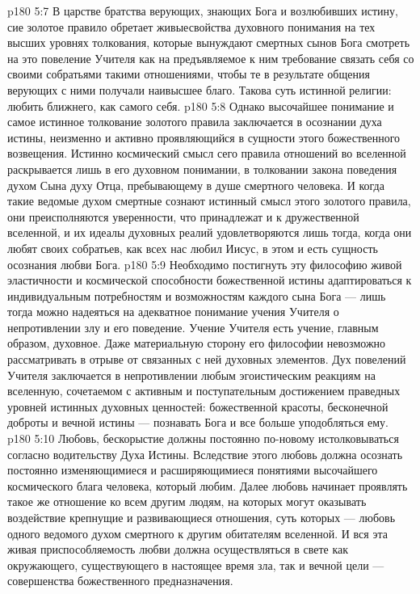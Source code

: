 \vs p180 5:7 В царстве братства верующих, знающих Бога и возлюбивших истину, сие золотое правило обретает живыесвойства духовного понимания на тех высших уровнях толкования, которые вынуждают смертных сынов Бога смотреть на это повеление Учителя как на предъявляемое к ним требование связать себя со своими собратьями такими отношениями, чтобы те в результате общения верующих с ними получали наивысшее благо. Такова суть истинной религии: любить ближнего, как самого себя.
\vs p180 5:8 Однако высочайшее понимание и самое истинное толкование золотого правила заключается в осознании духа истины, неизменно и активно проявляющийся в сущности этого божественного возвещения. Истинно космический смысл сего правила отношений во вселенной раскрывается лишь в его духовном понимании, в толковании закона поведения духом Сына духу Отца, пребывающему в душе смертного человека. И когда такие ведомые духом смертные сознают истинный смысл этого золотого правила, они преисполняются уверенности, что принадлежат и к дружественной вселенной, и их идеалы духовных реалий удовлетворяются лишь тогда, когда они любят своих собратьев, как всех нас любил Иисус, в этом и есть сущность осознания любви Бога.
\vs p180 5:9 Необходимо постигнуть эту философию живой эластичности и космической способности божественной истины адаптироваться к индивидуальным потребностям и возможностям каждого сына Бога --- лишь тогда можно надеяться на адекватное понимание учения Учителя о непротивлении злу и его поведение. Учение Учителя есть учение, главным образом, духовное. Даже материальную сторону его философии невозможно рассматривать в отрыве от связанных с ней духовных элементов. Дух повелений Учителя заключается в непротивлении любым эгоистическим реакциям на вселенную, сочетаемом с активным и поступательным достижением праведных уровней истинных духовных ценностей: божественной красоты, бесконечной доброты и вечной истины --- познавать Бога и все больше уподобляться ему.
\vs p180 5:10 Любовь, бескорыстие должны постоянно по\hyp{}новому истолковываться согласно водительству Духа Истины. Вследствие этого любовь должна осознать постоянно изменяющимиеся и расширяющимиеся понятиями высочайшего космического блага человека, который любим. Далее любовь начинает проявлять такое же отношение ко всем другим людям, на которых могут оказывать воздействие крепнущие и развивающиеся отношения, суть которых --- любовь одного ведомого духом смертного к другим обитателям вселенной. И вся эта живая приспособляемость любви должна осуществляться в свете как окружающего, существующего в настоящее время зла, так и вечной цели --- совершенства божественного предназначения.
